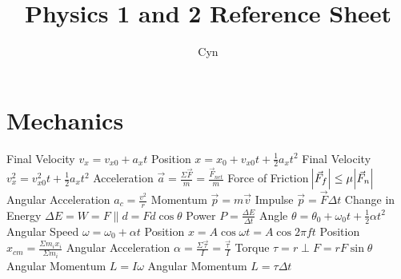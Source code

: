 \documentclass[11pt]{article}
\begin{document}
    \title{Physics 1 and 2 Reference Sheet}
    \author{Cyn}
    \maketitle

    \section{Mechanics}
    Final Velocity $v_{x} = v_{x0} + a_{x}t$\newline
    Position $x = x_{0} + v_{x0}t+\frac{1}{2}a_{x}t^{2}$\newline
    Final Velocity $v^{2}_{x} = v^{2}_{x0}t + \frac{1}{2}a_{x}t^{2}$\newline
    Acceleration $\vec{a} = \frac{\Sigma\vec{F}}{m} = \frac{\vec{F}_{net}}{m}$ \newline
    Force of Friction $\abs{\vec{F}_{f}} \leq \mu\abs{\vec{F}_{n}}$\newline
    Angular Acceleration $a_{c} = \frac{v^{2}}{r}$\newline
    Momentum $\vec{p} = m\vec{v}$\newline
    Impulse $\vec{p} = \vec{F}\Delta t$\newline
    Change in Energy $\Delta E = W = F\parallel d = Fd\cos{\theta}$\newline
    Power $P = \frac{\Delta E}{\Delta t}$\newline
    Angle $\theta = \theta_{0} + \omega_{0}t + \frac{1}{2}\alpha t^{2}$\newline
    Angular Speed $\omega = \omega_{0} + \alpha t$\newline
    Position $x = A\cos{\omega t} = A\cos{2\pi ft}$\newline
    Position $x_{cm} = \frac{\Sigma m_{i}x_{i}}{\Sigma m_{i}}$\newline
    Angular Acceleration $\alpha = \frac{\Sigma\vec{\tau}}{I} = \frac{\vec{\tau}}{I}$\newline
    Torque $\tau = r\perp F = rF\sin{\theta}$\newline
    Angular Momentum $L = I\omega$\newline
    Angular Momentum $L = \tau \Delta t$\newline
\end{document}
